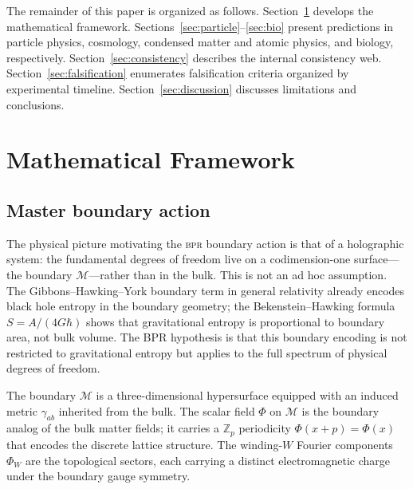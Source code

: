 \documentclass[aps,prd,twocolumn,superscriptaddress,longbibliography,nofootinbib]{revtex4-2}
\newcommand{\Zp}{\mathbb{Z}_p}
\newcommand{\bpr}{\textsc{bpr}}
\begin{document}
The remainder of this paper is organized as follows.
Section~\ref{sec:framework} develops the mathematical framework.
Sections~\ref{sec:particle}--\ref{sec:bio} present predictions in
particle physics, cosmology, condensed matter and atomic physics,
and biology, respectively.  Section~\ref{sec:consistency} describes
the internal consistency web.  Section~\ref{sec:falsification}
enumerates falsification criteria organized by experimental
timeline.  Section~\ref{sec:discussion} discusses limitations and
conclusions.


\section{Mathematical Framework}
\label{sec:framework}

\subsection{Master boundary action}

The physical picture motivating the \bpr{} boundary action is that of
a holographic system: the fundamental degrees of freedom live on a
codimension-one surface---the boundary $\mathcal{M}$---rather than
in the bulk.  This is not an ad hoc assumption.  The
Gibbons--Hawking--York boundary term in general relativity already
encodes black hole entropy in the boundary geometry; the
Bekenstein--Hawking formula $S = A/(4G\hbar)$ shows that
gravitational entropy is proportional to boundary area, not bulk
volume.  The BPR hypothesis is that this boundary encoding is not
restricted to gravitational entropy but applies to the full spectrum
of physical degrees of freedom.

The boundary $\mathcal{M}$ is a three-dimensional hypersurface
equipped with an induced metric $\gamma_{ab}$ inherited from the bulk.
The scalar field $\Phi$ on $\mathcal{M}$ is the boundary analog of
the bulk matter fields; it carries a $\Zp$ periodicity
$\Phi(x+p) = \Phi(x)$ that encodes the discrete lattice structure.
The winding-$W$ Fourier components $\Phi_W$ are the topological
sectors, each carrying a distinct electromagnetic charge under the
boundary gauge symmetry.
\end{document}
